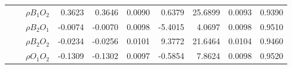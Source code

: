 \documentclass[letterpaper]{article}
\begin{document}
\begin{table}[h]
\begin{tabular}{cccrrrrrrr}
            &             & $\rho{B_1O_2}$ & 0.3623                 & 0.3646                 & 0.0090                 & 0.6379                 & 25.6899                & 0.0093                   & 0.9390                 \\
            &             & $\rho{B_2O_1}$ & -0.0074                & -0.0070                & 0.0098                 & -5.4015                & 4.0697                 & 0.0098                   & 0.9510                 \\
            &             & $\rho{B_2O_2}$ & -0.0234                & -0.0256                & 0.0101                 & 9.3772                 & 21.6464                & 0.0104                   & 0.9460                 \\    
            &             & $\rho{O_1O_2}$ & -0.1309                & -0.1302                & 0.0097                 & -0.5854                & 7.8624                 & 0.0098                   & 0.9520                \\  \hline
\end{tabular}
\end{table}
\end{document}
